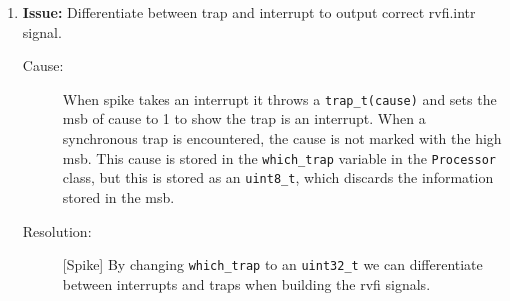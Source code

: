 \begin{enumerate}
\item \textbf{Issue:} Differentiate between trap and interrupt to output correct rvfi.intr signal.
  \begin{description}
    \item[Cause:] When spike takes an interrupt it throws a \lstinline{trap_t(cause)} and sets the msb of cause to 1 to show the trap is an interrupt. When a synchronous trap is encountered, the cause is not marked with the high msb. This cause is stored in the \lstinline{which_trap} variable in the \lstinline{Processor} class, but this is stored as an \lstinline{uint8_t}, which discards the information stored in the msb.
    \item[Resolution:] [Spike] By changing \lstinline{which_trap} to an \lstinline{uint32_t} we can differentiate between interrupts and traps when building the rvfi signals.
  \end{description}


  
\end{enumerate}
